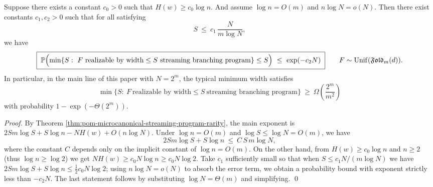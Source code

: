 \begin{corollary}\label{cor:pom-microcanonical-streaming-program-typical-width-lb}
Suppose there exists a constant \(c_0>0\) such that \(H(w)\ge c_0\log n\).
And assume \(\log n=O(m)\) and \(n\log N=o(N)\).
Then there exist constants \(c_1,c_2>0\) such that for all satisfying
\[
S\ \le\ c_1\,\frac{N}{m\log N},
\]
we have
\[
\boxed{\;
\mathbb{P}\Bigl(\min\{S:\ F\ \text{realizable by width}\le S\ \text{streaming branching program}\}\le S\Bigr)
\ \le\ \exp(-c_2N)\;}
\qquad
F\sim\mathrm{Unif}(\mathfrak{Fold}_m(d)).
\]
In particular, in the main line of this paper with \(N=2^m\), the typical minimum width satisfies
\[
\min\{S:\ F\ \text{realizable by width}\le S\ \text{streaming branching program}\}
\ \ge\ \Omega\!\left(\frac{2^m}{m^2}\right)
\]
with probability \(1-\exp(-\Theta(2^m))\).
\end{corollary}
\begin{proof}
By Theorem \ref{thm:pom-microcanonical-streaming-program-rarity}, the main exponent is
\(
2Sm\log S+S\log n-NH(w)+O(n\log N)
\).
Under \(\log n=O(m)\) and \(\log S\le \log N=O(m)\), we have
\[
2Sm\log S+S\log n\ \le\ C\,S\,m\log N,
\]
where the constant \(C\) depends only on the implicit constant of \(\log n=O(m)\).
On the other hand, from \(H(w)\ge c_0\log n\) and \(n\ge 2\) (thus \(\log n\ge \log 2\)) we get
\(
NH(w)\ge c_0N\log n\ge c_0N\log 2
\).
Take \(c_1\) sufficiently small so that when \(S\le c_1 N/(m\log N)\) we have \(2Sm\log S+S\log n\le \tfrac{1}{2}c_0N\log 2\);
using \(n\log N=o(N)\) to absorb the error term, we obtain a probability bound with exponent strictly less than \(-c_2N\).
The last statement follows by substituting \(\log N=\Theta(m)\) and simplifying. \qed
\end{proof}

\endinput

